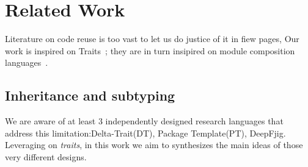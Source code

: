 
\saveSpace\saveSpace
\section{Related Work}
\saveSpace\saveSpace
Literature on code reuse is too vast to let us do justice of it in fiew pages,
Our work is inspired on Traits~\cite{ducasse2006traits}; they are in turn insipired on module composition languages~\cite{ancona2002calculus}.
\saveSpace
\subsection{Inheritance and subtyping}
\saveSpace
We are aware of at least 3 independently designed research languages 
that address this limitation:Delta-Trait(DT)\cite{ferruccioworks}, Package Template(PT)\cite{}, DeepFjig\cite{}.
Leveraging on \emph{traits}, in this work we aim to synthesizes
the main ideas of those very different designs.


